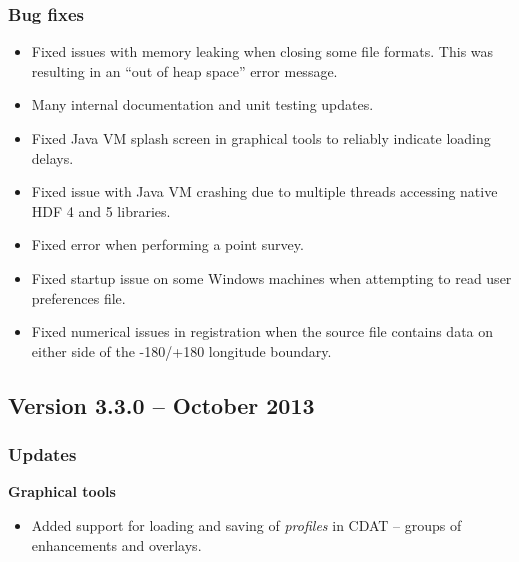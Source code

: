 \subsubsection*{ Bug fixes}
\begin{itemize}

  \item Fixed issues with memory leaking when closing some file formats.  This
  was resulting in an ``out of heap space'' error message.

  \item Many internal documentation and unit testing updates.

  \item Fixed Java VM splash screen in graphical tools to reliably indicate
  loading delays.

  \item Fixed issue with Java VM crashing due to multiple threads accessing
  native HDF 4 and 5 libraries.

  \item Fixed error when performing a point survey.

  \item Fixed startup issue on some Windows machines when attempting to
  read user preferences file.

  \item Fixed numerical issues in registration when the source file contains
  data on either side of the -180/+180 longitude boundary.

\end{itemize}


\subsection*{Version 3.3.0 -- October 2013}

\subsubsection*{ Updates}

\hspace{0.4cm} {\bf Graphical tools}

\begin{itemize}

  \item Added support for loading and saving of {\em profiles} in CDAT --
  groups of enhancements and overlays.


\end{itemize}

